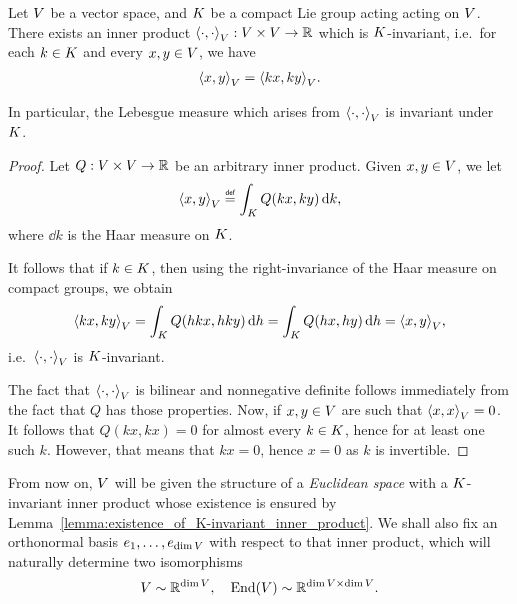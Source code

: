 \begin{lemma}
\label{lemma:existence_of_K-invariant_inner_product}
    Let $V$ be a vector space,
    and $K$ be a compact Lie group acting acting on $V$.
    There exists an inner product ${{\langle \cdot, \cdot \rangle}_{V}} : V \times V \to \mathbb{R}$ which is $K$-invariant,
    i.e.\ for each $k \in K$ and every $x, y \in V$, we have
    \begin{align*}
        {{\langle x, y \rangle}_{V}} = {{\langle k x, k y \rangle}_{V}}.
    \end{align*}

    In particular, the Lebesgue measure which arises from ${{\langle \cdot, \cdot \rangle}_{V}}$ is invariant under $K$.
\end{lemma}
\begin{proof}
    Let $Q : V \times V \to \mathbb{R}$ be an arbitrary inner product.
    Given $x, y \in V$, we let
    \begin{align*}
        \ip{x}{y} \defeq \int_\CompactGroup Q(k x, k y) \dd k,
    \end{align*}
    where $\dd k$ is the Haar measure on $K$.

    It follows that if $k \in K$,
    then using the right-invariance of the Haar measure on compact groups,
    we obtain
    \begin{align*}
        {{\langle k x, k y \rangle}_{V}}
        = \int_K Q(h k x, h k y) \,\mathrm{d} h
        = \int_K Q(h x, h y) \,\mathrm{d} h
        = {{\langle x, y \rangle}_{V}},
    \end{align*}
    i.e.\ ${{\langle \cdot, \cdot \rangle}_{V}}$ is $K$-invariant.

    The fact that ${{\langle \cdot, \cdot \rangle}_{V}}$ is bilinear and nonnegative definite follows immediately from the fact that $Q$ has those properties.
    Now, if $x, y \in V$ are such that ${{\langle x, x \rangle}_{V}} = 0$.
    It follows that $Q(k x, k x) = 0$ for almost every $k \in K$, hence for at least one such $k$.
    However, that means that $k x = 0$, hence $x = 0$ as $k$ is invertible.
\end{proof}

From now on, $V$ will be given the structure of a \emph{Euclidean space} with a $K$-invariant inner product
whose existence is ensured by Lemma~\ref{lemma:existence_of_K-invariant_inner_product}.
We shall also fix an orthonormal basis $e_1, \dots, e_{\dim V}$ with respect to that inner product,
which will naturally determine two isomorphisms
\begin{align*}
    V \sim \mathbb{R}^{\dim V}, \quad \operatorname{End}(V) \sim \mathbb{R}^{\dim V \times \dim V}.
\end{align*}

